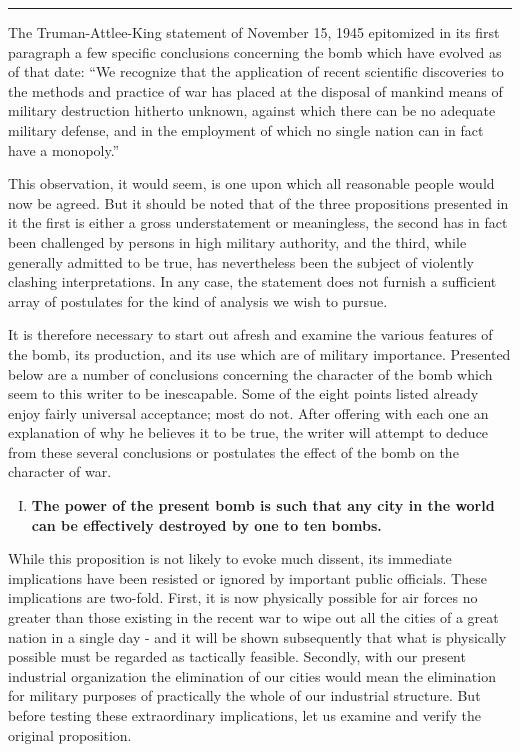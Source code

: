\noindent\hfil\rule{0.4\textwidth}{.4pt}\hfil

\vspace{4pt}

The Truman-Attlee-King statement of November 15, 1945 epitomized in its first paragraph a few specific conclusions concerning the bomb which have evolved as of that date: ``We recognize that the application of recent scientific discoveries to the methods and practice of war has placed at the disposal of mankind means of military destruction hitherto unknown, against which there can be no adequate military defense, and in the employment of which no single nation can in fact have a monopoly.''

This observation, it would seem, is one upon which all reasonable people would now be agreed. But it should be noted that of the three propositions presented in it the first is either a gross understatement or meaningless, the second has in fact been challenged by persons in high military authority, and the third, while generally admitted to be true, has nevertheless been the subject of violently clashing interpretations. In any case, the statement does not furnish a sufficient array of postulates for the kind of analysis we wish to pursue.

It is therefore necessary to start out afresh and examine the various features of the bomb, its production, and its use which are of military importance. Presented below are a number of conclusions concerning the character of the bomb which seem to this writer to be inescapable. Some of the eight points listed already enjoy fairly universal acceptance; most do not. After offering with each one an explanation of why he believes it to be true, the writer will attempt to deduce from these several conclusions or postulates the effect of the bomb on the character of war.

\begin{enumerate}[I.]

\item \textbf{The power of the present bomb is such that any city in the world can be effectively destroyed by one to ten bombs.}

\end{enumerate}

While this proposition is not likely to evoke much dissent, its immediate implications have been resisted or ignored by important public officials. These implications are two-fold. First, it is now physically possible for air forces no greater than those existing in the recent war to wipe out all the cities of a great nation in a single day - and it will be shown subsequently that what is physically possible must be regarded as tactically feasible. Secondly, with our present industrial organization the elimination of our cities would mean the elimination for military purposes of practically the whole of our industrial structure. But before testing these extraordinary implications, let us examine and verify the original proposition.


